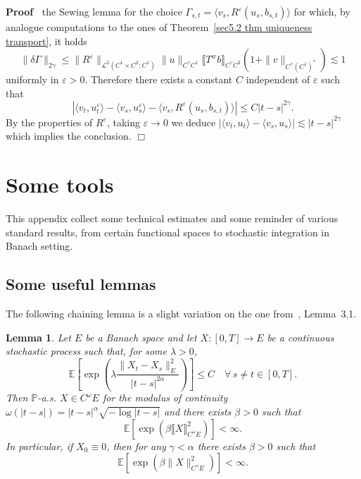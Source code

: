 \documentclass[10pt]{article}
\newenvironment{proof}{\noindent\textbf{Proof\ }}{\hspace*{\fill}$\Box$\medskip}
\newtheorem{lemma}{Lemma}
\begin{document}
\begin{proof}
  the Sewing lemma for the choice $\Gamma_{s, t} = \langle v_s,
  R^{\varepsilon} (u_s, b_{s, t}) \rangle$ for which, by analogue computations
  to the ones of Theorem~\ref{sec5.2 thm uniqueness transport}, it holds
  \[ \| \delta \Gamma \|_{2 \gamma} \leqslant \| R^{\varepsilon}
     \|_{\mathcal{L}^2 (C^1 \times C^2 ; C^1)} \| u \|_{C^{\gamma} C^1}
     \llbracket T^w b \rrbracket_{C^{\gamma} C^2} (1 + \| v \|_{C^{\gamma}
     (C^1)^{\ast}}) \lesssim 1 \]
  uniformly in $\varepsilon > 0$. Therefore there exists a constant $C$
  independent of $\varepsilon$ such that
  \[ | \langle v_t, u^{\varepsilon}_t \rangle - \langle v_s, u^{\varepsilon}_s
     \rangle - \langle v_s, R^{\varepsilon} (u_s, b_{s, t}) \rangle |
     \leqslant C | t - s |^{2 \gamma} . \]
  By the properties of $R^{\varepsilon}$, taking $\varepsilon \rightarrow 0$
  we deduce $| \langle v_t, u_t \rangle - \langle v_s, u_s \rangle | \lesssim
  | t - s |^{2 \gamma}$ which implies the conclusion.
\end{proof}

\appendix\section{Some tools}\label{appendix}

This appendix collect some technical estimates and some reminder of various
standard results, from certain functional spaces to stochastic integration in
Banach setting.

\subsection{Some useful lemmas}\label{appendixA1}

The following chaining lemma is a slight variation on the one
from~{\cite{catelliergubinelli}}, Lemma~3.1.

\begin{lemma}
  \label{appendixA1 chaining lemma}Let $E$ be a Banach space and let $X : [0,
  T] \rightarrow E$ be a continuous stochastic process such that, for some
  $\lambda > 0$,
  \begin{equation}
    \mathbb{E} \left[ \exp \left( \lambda \frac{\| X_t - X_s \|^2_E}{| t - s
    |^{2 \alpha}} \right) \right] \leqslant C \quad \forall \, s \neq t \in
    [0, T] .
  \end{equation}
  Then $\mathbb{P}$-a.s. $X \in C^{\omega} E$ for the modulus of continuity
  $\omega (| t - s |) = | t - s |^{\alpha} \sqrt{- \log | t - s |}$ and there
  exists $\beta > 0$ such that
  \[ \mathbb{E} [\exp (\beta \llbracket X \rrbracket^2_{C^{\omega} E})] <
     \infty . \]
  In particular, if $X_0 \equiv 0$, then for any $\gamma < \alpha$ there
  exists $\beta > 0$ such that
  \[ \mathbb{E} [\exp (\beta \| X \|^2_{C^{\gamma} E})] < \infty . \]
\end{lemma}
\end{document}

